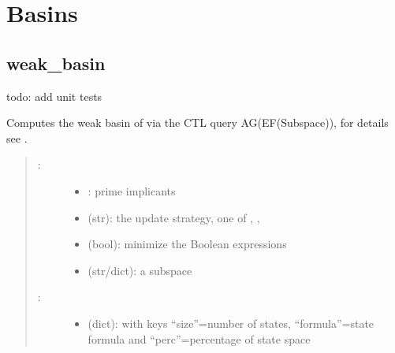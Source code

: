 \documentclass[letterpaper,10pt,english]{sphinxmanual}
\begin{document}
\section{Basins}
\label{\detokenize{Basins:basins}}\label{\detokenize{Basins::doc}}\label{\detokenize{Basins:id1}}

\subsection{weak\_basin}
\label{\detokenize{Basins:weak-basins}}\label{\detokenize{Basins:weak-basin}}

\begin{fulllineitems}
\label{\detokenize{Basins:PyBoolNet.Basins.weak_basin}}
todo: add unit tests

Computes the weak basin of  via the CTL query AG(EF(Subspace)), for details see {\hyperref[\detokenize{Bibliography:klarner2018}]{}}.
\begin{quote}
\begin{description}
\item[{:}] \leavevmode\begin{itemize}
\item {} 
: prime implicants

\item {} 
 (str):  the update strategy, one of , , 

\item {} 
 (bool): minimize the Boolean expressions

\item {} 
 (str/dict): a subspace

\end{itemize}

\item[{:}] \leavevmode\begin{itemize}
\item {} 
 (dict): with keys “size”=number of states, “formula”=state formula and “perc”=percentage of state space


\end{itemize}
\end{description}
\end{quote}
\end{fulllineitems}
\end{document}
